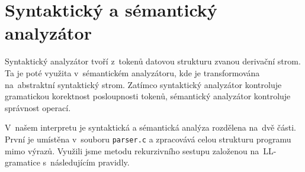 \documentclass[12pt,a4paper,titlepage,final]{article}
\begin{document}
\section{Syntaktický a sémantický analyzátor}
Syntaktický analyzátor tvoří z~tokenů datovou strukturu zvanou derivační
strom. Ta je poté využita v~sémantickém analyzátoru, kde je transformována
na~abstraktní syntaktický strom. Zatímco syntaktický analyzátor kontroluje
gramatickou korektnost posloupnosti tokenů, sé\-man\-ti\-cký analyzátor kontroluje
správnost operací.

V~našem interpretu je syntaktická a sémantická analýza rozdělena na~dvě
části. První je umístěna v~souboru \texttt{parser.c} a zpracovává celou strukturu programu
mimo výrazů. Využili jsme metodu rekurzivního sestupu založenou na~LL-gramatice
s~následujícím pravidly.
\end{document}
